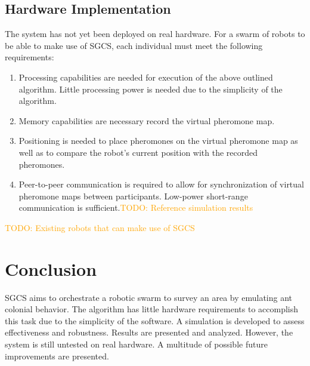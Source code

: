 \documentclass[a4paper, 12pt, times]{article}
\newcommand{\todo}[1]{\textcolor{orange}{TODO: #1}}
\begin{document}
\begin{multicols}{2}
\subsection{Hardware Implementation}
The system has not yet been deployed on real hardware. For a swarm of robots to be able to make use of SGCS, each individual must meet the following requirements:
\begin{enumerate}
	\item Processing capabilities are needed for execution of the above outlined algorithm. Little processing power is needed due to the simplicity of the algorithm. 
	\item Memory capabilities are necessary record the virtual pheromone map.
	\item Positioning is needed to place pheromones on the virtual pheromone map as well as to compare the robot's current position with the recorded pheromones.
	\item Peer-to-peer communication is required to allow for synchronization of virtual pheromone maps between participants. Low-power short-range communication is sufficient.\todo{Reference simulation results}
\end{enumerate}
\todo{Existing robots that can make use of SGCS}
\section{Conclusion}
SGCS aims to orchestrate a robotic swarm to survey an area by emulating ant colonial behavior. The algorithm has little hardware requirements to accomplish this task due to the simplicity of the software. A simulation is developed to assess effectiveness and robustness. Results are presented and analyzed. However, the system is still untested on real hardware. A multitude of possible future improvements are presented. \end{multicols}
\printbibliography
\end{document}
